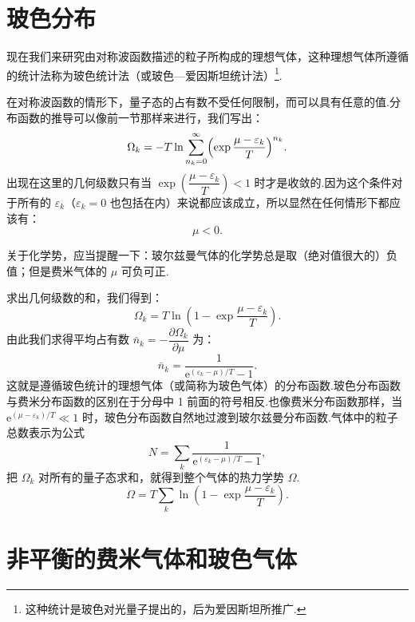 \section{玻色分布}

现在我们来研究由对称波函数描述的粒子所构成的理想气体，这种理想气体所遵循的统计法称为玻色统计法（或玻色—爱因斯坦统计法）\footnote{这种统计是玻色对光量子提出的，后为爱因斯坦所推广.}.

在对称波函数的情形下，量子态的占有数不受任何限制，而可以具有任意的值.分布函数的推导可以像前一节那样来进行，我们写出：
\begin{equation*}
  \Omega_k=-T\ln\sum_{n_k=0}^{\infty}\Bigl(\exp\frac{\mu-\varepsilon_k}{T}\Bigr)^{n_k}.
\end{equation*}
出现在这里的几何级数只有当 $\exp\left(\dfrac{\mu-\varepsilon_k}{T}\right)<1$ 时才是收敛的.因为这个条件对于所有的 $\varepsilon_k$（$\varepsilon_k=0$ 也包括在内）来说都应该成立，所以显然在任何情形下都应该有：
\begin{equation}
  \mu<0.
\end{equation}

关于化学势，应当提醒一下：玻尔兹曼气体的化学势总是取（绝对值很大的）负值；但是费米气体的 $\mu$ 可负可正.

求出几何级数的和，我们得到：
\begin{equation*}
  \Omega_k=T\ln\left(1-\exp\frac{\mu-\varepsilon_k}{T}\right).
\end{equation*}
由此我们求得平均占有数 $\bar{n}_k=-\dfrac{\partial\Omega_k}{\partial\mu}$ 为：
\begin{equation}
  \bar{n}_k=\frac{1}{\mathrm{e}^{(\varepsilon_k-\mu)/T}-1}.
\end{equation}
这就是遵循玻色统计的理想气体（或简称为玻色气体）的分布函数.玻色分布函数与费米分布函数的区别在于分母中 1 前面的符号相反.也像费米分布函数那样，当 $\mathrm{e}^{(\mu-\varepsilon_k)/T}\ll1$ 时，玻色分布函数自然地过渡到玻尔兹曼分布函数.气体中的粒子总数表示为公式
\begin{equation}
  N=\sum_k\frac{1}{\mathrm{e}^{(\varepsilon_k-\mu)/T}-1},
\end{equation}
把 $\Omega_k$ 对所有的量子态求和，就得到整个气体的热力学势 $\Omega$.
\begin{equation}
  \Omega=T\sum_k\ln\left(1-\exp\frac{\mu-\varepsilon_k}{T}\right).
\end{equation}

\section{非平衡的费米气体和玻色气体}

